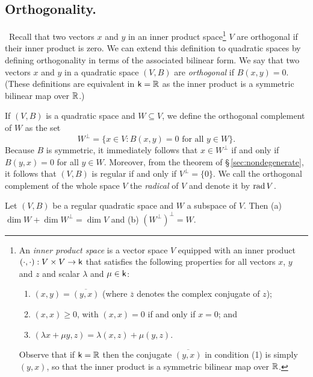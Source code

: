 \subsection{Orthogonality.}~Recall that two vectors \(x\) and \(y\) in an inner
product space\footnote{ An \emph{inner product space} is a vector space \(V\)
equipped with an inner product \((\cdot, \cdot): V \times V \to \mathsf{k}\) that
satisfies the following properties for all vectors \(x\), \(y\) and \(z\) and
scalar \(\lambda\) and \(\mu \in \mathsf{k}\):
\begin{enumerate}
  \item \((x, y) = \overline{(y, x)}\) (where \(\overline{z}\) denotes the
  complex conjugate of \(z\));
  \item \((x, x) \geq 0\), with \((x, x) = 0\) if and only if \(x = 0\); and
  \item \((\lambda x + \mu y, z) = \lambda(x, z) + \mu(y, z)\).
\end{enumerate}
Observe that if \(\mathsf{k} = \mathbb{R}\) then the conjugate \(\overline{(y, x)}\) in
condition (1) is simply \((y, x)\), so that the inner product is a symmetric
bilinear map over \(\mathbb{R}\).} \(V\) are orthogonal if their inner product is
zero. We can extend this definition to quadratic spaces by defining
orthogonality in terms of the associated bilinear form. We say that two vectors
\(x\) and \(y\) in a quadratic space \((V, B)\) are \emph{orthogonal} if \(B(x,
y) = 0\). (These definitions are equivalent in \(\mathsf{k} = \mathbb{R}\) as the inner
product is a symmetric bilinear map over \(\mathbb{R}\).)\label{sec:orthogonality}

If \((V, B)\) is a quadratic space and \(W \subseteq V\), we define the
orthogonal complement of \(W\) as the set
\[
  W^{\perp} = \{x \in V : B(x, y) = 0 \text{ for all } y \in W\}.
\]
Because \(B\) is symmetric, it immediately follows that \(x \in W^{\perp}\) if
and only if \(B(y, x) = 0\) for all \(y \in W\). Moreover, from the theorem of
\S\,\ref{sec:nondegenerate}, it follows that \((V,B)\) is regular if and only if
\(V^{\perp} = \{0\}\). We call the orthogonal complement of the whole space
\(V\) the \emph{radical} of \(V\) and denote it by \(\operatorname{rad} V\).

\begin{theorem}\label{thm:orthogonal-complement} {\normalfont
    \cite[p.~7]{lam1973quadratic}} Let \((V, B)\) be a regular quadratic space
    and \(W\) a subspace of \(V\). Then {\normalfont (a)} \(\dim W + \dim
    W^{\perp} = \dim V\) and {\normalfont (b)} \((W^{\perp})^{\perp} = W\).
\end{theorem}

